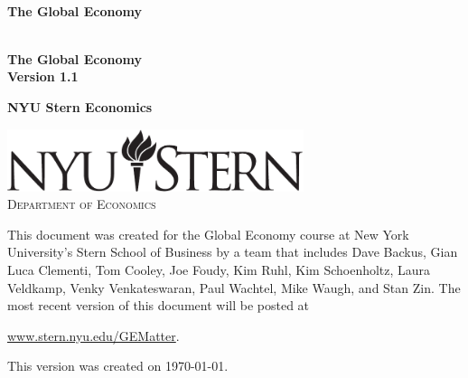 \begin{titlepage}

\begin{center}
\textsc{}\\[1.5in]
{\Huge\bf The Global Economy} \\ [0.5in]
\end{center}

\pagebreak
\phantom{x}
\thispagestyle{empty}

\pagebreak
\thispagestyle{empty}
\begin{center}
\textsc{}\\[1.5in]
{\Huge\bf The Global Economy} \\ [0.25in]
{\huge\bf Version 1.1}

\vspace*{1.00in}
{\huge\bf NYU Stern Economics}

\vfill
{\includegraphics[width=0.65\textwidth]{Figures/stern_logo3.pdf}\\
\textsc{\large Department of Economics}\\[1.5in]
}
\end{center}


\newpage
\thispagestyle{empty}
\phantom{x}
\vfill
This document was created for the Global Economy course at New York
University's Stern School of Business by a team that includes
Dave Backus, Gian Luca Clementi, Tom Cooley, Joe Foudy, Kim Ruhl,
Kim Schoenholtz, Laura Veldkamp, Venky Venkateswaran, Paul Wachtel, Mike Waugh,
and Stan Zin.
The most recent version of this document will be posted at

\vspace*{\parskip}
\centerline{\url{www.stern.nyu.edu/GEMatter}.}

This version was created on \today.


\end{titlepage}
